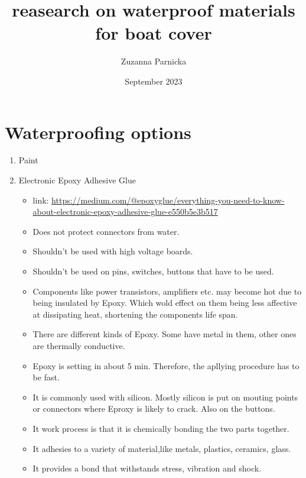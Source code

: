 \documentclass{article}[10pt]
\title{reasearch on waterproof materials for boat cover}
\author{Zuzanna Parnicka}
\date{September 2023}
\begin{document}
\renewcommand{\labelenumii}{\arabic{enumi}.\arabic{enumii}}
\renewcommand{\labelenumiii}{\arabic{enumi}.\arabic{enumii}.\arabic{enumiii}}
\renewcommand{\labelenumiv}{\arabic{enumi}.\arabic{enumii}.\arabic{enumiii}.\arabic{enumiv}}

\maketitle
\section{Waterproofing options}

\begin{enumerate}
    \item Paint
    \item Electronic Epoxy Adhesive Glue
          \begin{itemize}
              \item link: \url{https://medium.com/@epoxyglue/everything-you-need-to-know-about-electronic-epoxy-adhesive-glue-e550b5e3b517}
              \item Does not protect connectors from water.
              \item Shouldn't be used with high voltage boards.
              \item Shouldn't be used on pins, switches, buttons that have to be used.
              \item Components like power transistors, amplifiers etc. may become hot due to being insulated by Epoxy. Which wold effect on them being less affective at dissipating heat, shortening the components life span.
              \item There are different kinds of Epoxy. Some have metal in them, other ones are thermally conductive.
              \item Epoxy is setting in about 5 min. Therefore, the apllying procedure has to be fast.
              \item It is commonly used with silicon. Mostly silicon is put on mouting points or connectors where Eproxy is likely to crack. Also on the buttons.
              \item It work process is that it is chemically bonding the two parts together.
              \item It adhesies to a variety of material,like metals, plastics, ceramics, glass.
              \item It provides a bond that withstands stress, vibration and shock.

\end{itemize}
\end{enumerate}
\end{document}

